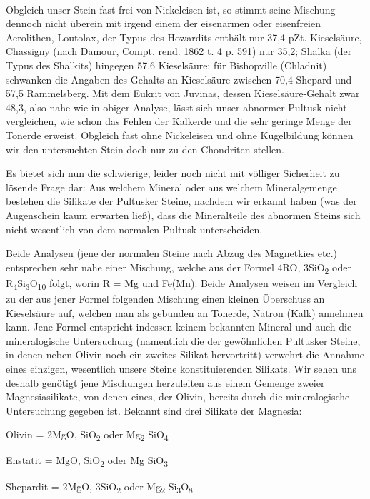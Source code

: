 \documentclass[a4paper, 11pt, oneside, german]{article}
\begin{document}
\paragraph{}
Obgleich unser Stein fast frei von Nickeleisen ist, so stimmt seine Mischung dennoch nicht überein mit irgend einem der eisenarmen oder eisenfreien Aerolithen, Loutolax, der Typus des Howardits enthält nur 37,4 pZt. Kieselsäure, Chassigny (nach Damour, Compt. rend. 1862 t. 4 p. 591) nur 35,2; Shalka (der Typus des Shalkits) hingegen 57,6 Kieselsäure; für Bishopville (Chladnit) schwanken die Angaben des Gehalts an Kieselsäure zwischen 70,4 Shepard und 57,5 Rammelsberg. Mit dem Eukrit von Juvinas, dessen Kieselsäure-Gehalt zwar 48,3, also nahe wie in obiger Analyse, lässt sich unser abnormer Pultusk nicht vergleichen, wie schon das Fehlen der Kalkerde und die sehr geringe Menge der Tonerde erweist. Obgleich fast ohne Nickeleisen und ohne Kugelbildung können wir den untersuchten Stein doch nur zu den Chondriten stellen.

Es bietet sich nun die schwierige, leider noch nicht mit völliger Sicherheit zu lösende Frage dar: Aus welchem Mineral oder aus welchem Mineralgemenge bestehen die Silikate der Pultusker Steine, nachdem wir erkannt haben (was der Augenschein kaum erwarten ließ), dass die Mineralteile des abnormen Steins sich nicht wesentlich von dem normalen Pultusk unterscheiden.

Beide Analysen (jene der normalen Steine nach Abzug des Magnetkies etc.) entsprechen sehr nahe einer Mischung, welche aus der Formel 4RO, 3SiO\textsubscript{2} oder R\textsubscript{4}Si\textsubscript{3}O\textsubscript{10} folgt, worin R = Mg und Fe(Mn). Beide Analysen weisen im Vergleich zu der aus jener Formel folgenden Mischung einen kleinen Überschuss an Kieselsäure auf, welchen man als gebunden an Tonerde, Natron (Kalk) annehmen kann. Jene Formel entspricht indessen keinem bekannten Mineral und auch die mineralogische Untersuchung (namentlich die der gewöhnlichen Pultusker Steine, in denen neben Olivin noch ein zweites Silikat hervortritt) verwehrt die Annahme eines einzigen, wesentlich unsere Steine konstituierenden Silikats. Wir sehen uns deshalb genötigt jene Mischungen herzuleiten aus einem Gemenge zweier Magnesiasilikate, von denen eines, der Olivin, bereits durch die mineralogische Untersuchung gegeben ist. Bekannt sind drei Silikate der Magnesia:
\begin{center}
Olivin = 2MgO, SiO\textsubscript{2} oder Mg\textsubscript{2} SiO\textsubscript{4}

Enstatit = MgO, SiO\textsubscript{2} oder Mg SiO\textsubscript{3}

Shepardit = 2MgO, 3SiO\textsubscript{2} oder Mg\textsubscript{2} Si\textsubscript{3}O\textsubscript{8}
\end{center}
\end{document}
